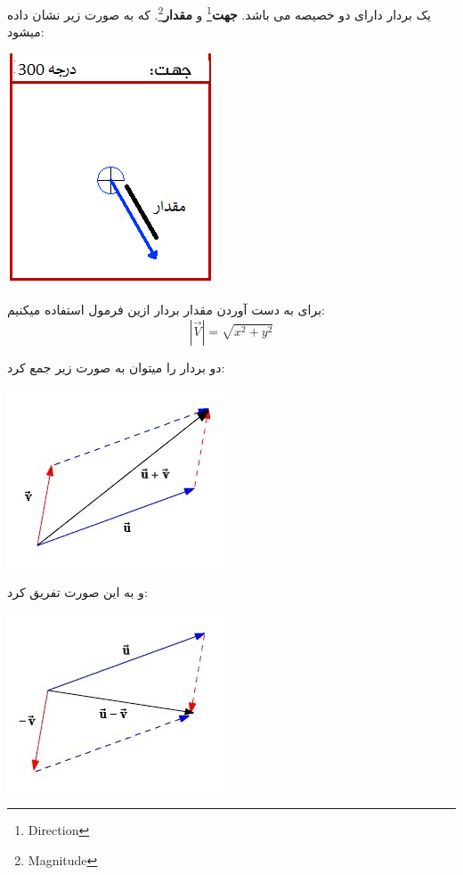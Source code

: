 \documentclass[14pt,a4paper]{memoir}
\begin{document}
	
یک بردار دارای دو خصیصه می باشد. \textbf{جهت}\footnote{Direction} و \textbf{مقدار}\footnote{Magnitude}. که به صورت زیر نشان داده میشود:

	
		 \begin{center}
		\includegraphics[scale=1]{DirMag}
	\end{center}

برای به دست آوردن مقدار بردار ازین فرمول استفاده میکنیم:
\[ |\vec{V}| =  \sqrt{x^2 + y^2} \]
	
	
	
	 
	 دو بردار را میتوان به صورت زیر جمع کرد:
	 
	 
	 	 \begin{center}
	 	\includegraphics[scale=1]{VectorAdd}
	 \end{center}
 
 و به این صورت تفریق کرد:
  
 \begin{center}
 	\includegraphics[scale=1]{VectorSubtract}
 \end{center}
 
\end{document}
